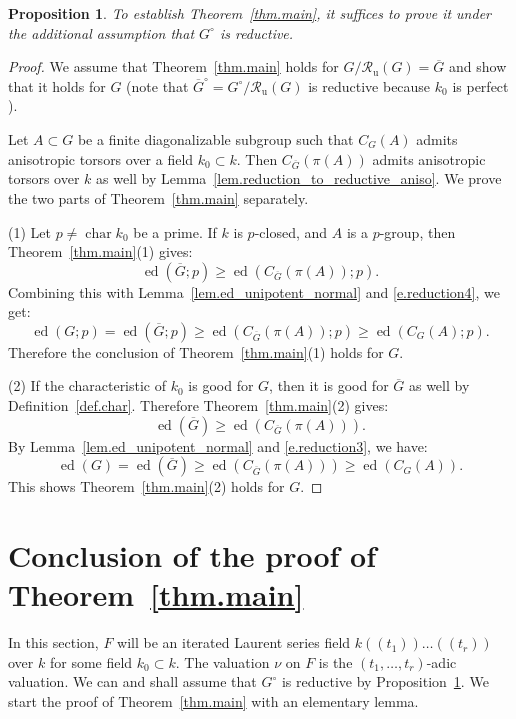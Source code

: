 \documentclass[12pt]{amsart}
\numberwithin{equation}{section}
\newtheorem{proposition}[theorem]{Proposition}
\theoremstyle{definition}
\newcommand{\Ru}{\mathcal{R}_{\mathrm{u}}}
\newcommand{\ed}{\operatorname{ed}}
\newcommand{\Char}{\operatorname{char}}
\begin{document}
\begin{proposition}\label{prop.reduction_to_reductive}
    To establish Theorem~\ref{thm.main}, it suffices to prove it under the additional assumption that $G^{\circ}$ is reductive.
\end{proposition}
\begin{proof}
    We assume that Theorem~\ref{thm.main} holds for $G/\Ru(G)=\overline{G}$ and show that it holds for $G$ (note that $\overline{G}^{\circ} = G^{\circ}/\Ru(G)$ is reductive because $k_0$ is perfect \cite[Proposition 19.11]{milne2017algebraic}).

    Let $A\subset G$ be a finite diagonalizable subgroup such that $C_G(A)$ admits anisotropic torsors over a field $k_0\subset k$. Then $C_{\overline{G}}(\pi(A))$ admits anisotropic torsors over $k$ as well by Lemma~\ref{lem.reduction_to_reductive_aniso}. We prove the two parts of Theorem~\ref{thm.main} separately.

    \smallskip
    (1) Let $p\neq \Char k_0$ be a prime. If $k$ is $p$-closed, and $A$ is a $p$-group, then Theorem~\ref{thm.main}(1) gives:
    $$ \ed({\overline{G}};p)\geq  \ed(C_{\overline{G}}(\pi(A));p).$$
    Combining this with Lemma~\ref{lem.ed_unipotent_normal} and \eqref{e.reduction4}, we get:
    $$\ed(G;p) = \ed({\overline{G}};p)\geq  \ed(C_{\overline{G}}(\pi(A));p) \geq \ed(C_G(A);p).$$
    Therefore the conclusion of  Theorem~\ref{thm.main}(1) holds for $G$.

\smallskip
    (2) If the characteristic of $k_0$ is good for $G$, then it is good for $\overline{G}$ as well by Definition~\ref{def.char}. Therefore Theorem~\ref{thm.main}(2) gives:
    $$ \ed({\overline{G}})\geq  \ed(C_{\overline{G}}(\pi(A))).$$
    By Lemma~\ref{lem.ed_unipotent_normal} and \eqref{e.reduction3}, we have:
    $$\ed(G) = \ed({\overline{G}})\geq  \ed(C_{\overline{G}}(\pi(A))) \geq \ed(C_G(A)).$$
    This shows  Theorem~\ref{thm.main}(2) holds for $G$.
\end{proof}

\section{Conclusion of the proof of Theorem~\ref{thm.main}}\label{sect.proof_of_main_thm}

In this section, $F$ will be an iterated Laurent series field $k(\!(t_1)\!)\dots(\!(t_r)\!)$ over $k$ for some field $ k_0\subset k$. The valuation $\nu$ on $F$ is the $(t_1,\dots,t_r)$-adic valuation. We can and shall assume that $G^{\circ}$ is reductive by Proposition~\ref{prop.reduction_to_reductive}. We start the proof of Theorem~\ref{thm.main} with an elementary lemma.
\end{document}
